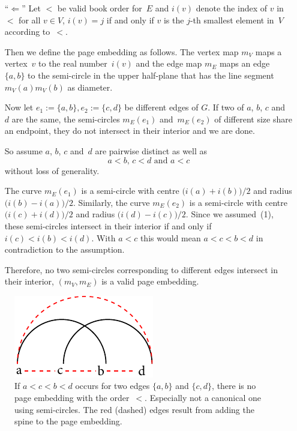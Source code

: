 \begin{myproof}
\begin{itemize}
\item[``$\Leftarrow$'']
Let $<$ be valid book order for~$E$ and $i(v)$ denote the index of $v$ in $<$ for
all $v \in V$, \ie $i(v) = j$ if and only if $v$ is the $j$-th smallest element in~$V$
according to~$<$.
 
Then we define the page embedding as follows. The vertex map $m_V$ maps a vertex~$v$ 
to the real number~$i(v)$ and the edge map $m_E$ maps an edge~$\{a, b\}$ to the semi-circle
in the upper half-plane that has
the line segment $m_V(a)m_V(b)$ as diameter.

Now let $e_1 := \{a, b\}, e_2 := \{c, d\}$ be different edges of $G$.
If two of $a$, $b$, $c$ and~$d$ are the same, the semi-circles
$m_E(e_1)$ and~$m_E(e_2)$ of different size share an endpoint, \ie they do not intersect in their
interior and we are done. 

So assume $a$, $b$, $c$ and~$d$ are pairwise distinct
as well as \[ \text{$a < b$, $c < d$ and $a < c$} \tag{1}\] without
loss of generality.

The curve $m_E(e_1)$ is a semi-circle with centre $\bigl(i(a) + i(b)\bigr)/2$ and radius $\bigl(i(b) - i(a)\bigr)/2$. Similarly, the curve $m_E(e_2)$ is a semi-circle with centre $\bigl(i(c) + i(d)\bigr)/2$ and radius $\bigl(i(d) - i(c)\bigr)/2$.
Since we assumed~(1), these semi-circles intersect in their interior if and only if $i(c) < i(b) < i(d)$.
With $a < c$ this would mean $a < c < b < d$ in contradiction to the assumption.

Therefore, no two semi-circles corresponding to different edges intersect in their interior,
\ie $(m_V, m_E)$ is a valid page embedding.\qedhere
\end{itemize}
\end{myproof}

\begin{figure}[\placement]\centering
    \includegraphics{figures/t_total_order}
    \caption[Book embedding constraints]{If $a < c < b < d$ occurs for two edges $\{a, b\}$ and $\{c,d\}$,
there is no page embedding with the order~$<$. Especially not a canonical one using semi-circles. The
red (dashed) edges result from adding the spine to the page embedding.}
    \label{figure:total}
\end{figure}

